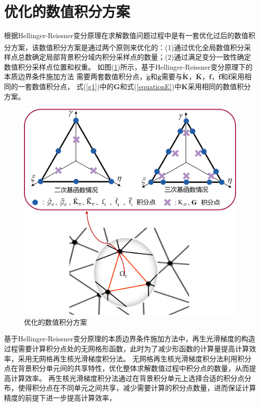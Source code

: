 \section{优化的数值积分方案}
根据Hellinger-Reissner变分原理在求解数值问题过程中是有一套优化过后的数值积分方案\textsuperscript{\cite{wang2019}}，该数值积分方案是通过两个原则来优化的：(1)通过优化全局数值积分采样点总数确定局部背景积分域内积分采样点的数量；(2)通过满足变分一致性确定数值积分采样点位置和权重。
如图(\ref{Eintegralscheme})所示，基于Hellinger-Reissner变分原理下的本质边界条件施加方法
需要两套数值积分点，$\tilde{\pmb g}$和$\bar{\pmb g}$需要与$\tilde{\pmb{K}}$，$\bar{\pmb{K}}$，$\pmb{f}$，$\tilde{\pmb{f}}$和$\bar{\pmb{f}}$采用相同的一套数值积分点，
式(\ref{g1})中的$\pmb{G}$和式(\ref{equationE})中$\pmb{K}$采用相同的数值积分方案。\par
\begin{figure}[H]
    \centering
    \includegraphics[scale=0.6]{figure/EHR/Eintegralscheme.png}
    \caption{优化的数值积分方案}\label{Eintegralscheme}
\end{figure}
基于Hellinger-Reissner变分原理的本质边界条件施加方法中，再生光滑梯度的构造过程需要计算积分点处的无网格形函数，此时为了减少形函数的计算量提高计算效率，采用无网格再生核光滑梯度积分法。
无网格再生核光滑梯度积分法利用积分点在背景积分单元间的共享特性，优化整体求解数值过程中积分点的数量，从而提高计算效率。
再生核光滑梯度积分法通过在背景积分单元上选择合适的积分点分布，使得积分点在不同单元之间共享，减少需要计算的积分点数量，进而保证计算精度的前提下进一步提高计算效率，
